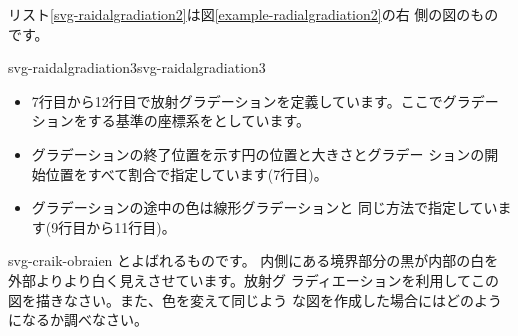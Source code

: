 リスト\ref{svg-raidalgradiation2}は図\ref{example-radialgradiation2}の右
側の図のものです。

  {svg-raidalgradiation3}{svg-raidalgradiation3}
\begin{itemize}
 \item 7行目から12行目で放射グラデーションを定義しています。ここでグラデー
       ションをする基準の座標系をとしています。
 \item グラデーションの終了位置を示す円の位置と大きさとグラデー
       ションの開始位置をすべて割合で指定しています(7行目)。
 \item グラデーションの途中の色は線形グラデーションと
       同じ方法で指定しています(9行目から11行目)。
\end{itemize}
{svg-craik-obraien}
{とよばれるものです。
内側にある境界部分の黒が内部の白を外部よりより白く見えさせています。放射グ
 ラディエーションを利用してこの図を描きなさい。また、色を変えて同じよう
 な図を作成した場合にはどのようになるか調べなさい。}

